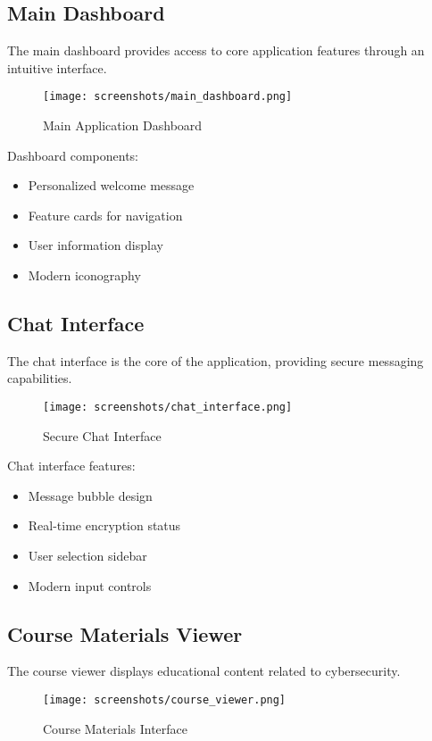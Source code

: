 \documentclass[12pt,a4paper]{article}
\begin{document}
\subsection{Main Dashboard}
The main dashboard provides access to core application features through an intuitive interface.

\begin{figure}[H]
    \centering
    \texttt{[image: screenshots/main\_dashboard.png]}
    \caption{Main Application Dashboard}
    \label{fig:dashboard}
\end{figure}

Dashboard components:
\begin{itemize}
    \item Personalized welcome message
    \item Feature cards for navigation
    \item User information display
    \item Modern iconography
\end{itemize}

\subsection{Chat Interface}
The chat interface is the core of the application, providing secure messaging capabilities.

\begin{figure}[H]
    \centering
    \texttt{[image: screenshots/chat\_interface.png]}
    \caption{Secure Chat Interface}
    \label{fig:chat}
\end{figure}

Chat interface features:
\begin{itemize}
    \item Message bubble design
    \item Real-time encryption status
    \item User selection sidebar
    \item Modern input controls
\end{itemize}

\subsection{Course Materials Viewer}
The course viewer displays educational content related to cybersecurity.

\begin{figure}[H]
    \centering
    \texttt{[image: screenshots/course\_viewer.png]}
    \caption{Course Materials Interface}
    \label{fig:course}
\end{figure}
\end{document}
